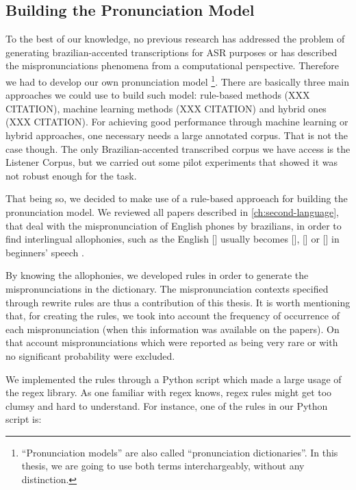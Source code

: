 \clearpage
\subsection{Building the Pronunciation Model}

To the best of our knowledge, no previous research has addressed the problem of generating brazilian-accented 
transcriptions for \ac{ASR} purposes or has described the mispronunciations phenomena from a computational perspective. 
Therefore we had to develop our own pronunciation model
\footnote{``Pronunciation models'' are also called ``pronunciation dictionaries''. In this thesis, we are going to
use both terms interchargeably, without any distinction.}. There are basically 
three main approaches we could use to build such model: rule-based methods (XXX CITATION), machine learning methods (XXX CITATION)
and hybrid ones (XXX CITATION). For achieving good performance through machine learning or hybrid approaches, one necessary 
needs a large annotated corpus. That is not the case though. The only Brazilian-accented transcribed corpus we have access
is the Listener Corpus, but we carried out some pilot experiments that showed it was not robust enough for the task.

That being so, we decided to make use of a rule-based approeach for building the pronunciation model. We reviewed all papers 
described in \autoref{ch:second-language}, that deal with the mispronunciation of English phones by brazilians, in order to find 
interlingual allophonies, such as the English [] usually becomes [], [] or [] in 
beginners' speech \citep{Reis2006}. 

By knowing the allophonies, we developed rules in order to generate the mispronunciations in the dictionary. The mispronunciation contexts
specified through rewrite rules are thus a contribution of this thesis. It is worth mentioning that, for creating the rules, we
took into account the frequency of occurrence of each mispronunciation (when this information was available 
on the papers). On that account mispronunciations which were reported as being very rare or with no significant probability were excluded.

We implemented the rules through a Python script which made a large usage of the \ac{regex} library. As one familiar 
with \ac{regex} knows, \ac{regex} rules might get too clumsy and hard to understand. For instance, one of the rules in our Python script is:

